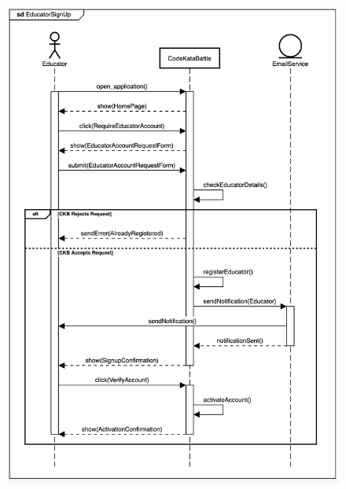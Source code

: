 \documentclass{Configuration_Files/Template}
\begin{document}
\begin{figure}[H]
\includegraphics[scale = 0.45]{Images/SequenceDiagrams/EducatorSignUpSeqDiagram.png}\\
\centering
\end{figure}
\end{document}
